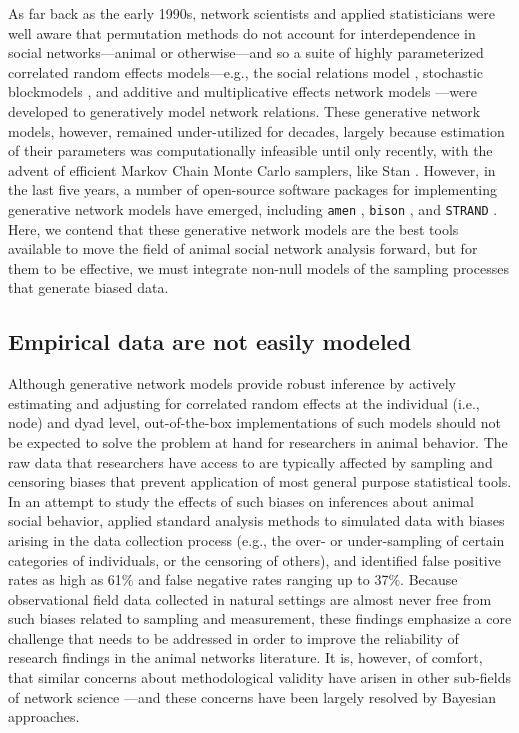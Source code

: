 \documentclass[Afour,sageh,times]{sagej}
\begin{document}
As far back as the early 1990s, network scientists and applied statisticians were well aware that permutation methods do not account for interdependence in social networks---animal or otherwise---and so a suite of highly parameterized correlated random effects models---e.g., the social relations model \citep{kenny1984social, snijders1999social, back2010social}, stochastic blockmodels \citep{pearl1983techniques, holland1983stochastic, karrer2011stochastic, peixoto2019bayesian}, and additive and multiplicative effects network models \citep{hoff2021}---were developed to generatively model network relations. 
These generative network models, however, remained under-utilized for decades, largely because estimation of their parameters was computationally infeasible until only recently, with the advent of efficient Markov Chain Monte Carlo samplers, like Stan \citep{stan2021}.
However, in the last five years, a number of open-source software packages for implementing generative network models have emerged, including \texttt{amen} \citep{hoff2021}, \texttt{bison} \citep{hart2023bison}, and \texttt{STRAND} \citep{ross2022modelling}. Here, we contend that these generative network models are the best tools available to move the field of animal social network analysis forward, but for them to be effective, we must integrate non-null models of the sampling processes that generate biased data.  

\subsection{Empirical data are not easily modeled}
Although generative network models provide robust inference by actively estimating and adjusting for correlated random effects at the individual (i.e., node) and dyad level, out-of-the-box implementations of such models should not be expected to solve the problem at hand for researchers in animal behavior. The raw data that researchers have access to are typically affected by sampling and censoring biases that prevent application of most general purpose statistical tools. 
In an attempt to study the effects of such biases on inferences about animal social behavior, \citet{Puga2021} applied standard analysis methods to simulated data with biases arising in the data collection process (e.g., the over- or under-sampling of certain categories of individuals, or the censoring of others), and identified false positive rates as high as 61\% and false negative rates ranging up to 37\%. Because observational field data collected in natural settings are almost never free from such biases related to sampling and measurement, these findings emphasize a core challenge that needs to be addressed in order to improve the reliability of research findings in the animal networks literature. It is, however, of comfort, that similar concerns about methodological validity have arisen in other sub-fields of network science \citep[e.g.,][]{butts2003network}---and these concerns have been largely resolved by Bayesian approaches. 
\end{document}
